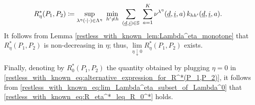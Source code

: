 \begin{equation}
	R_\eta^*(P_1,P_2)\coloneqq \sup\limits_{\lambda^\eta(\cdot\mid\cdot)\in \Lambda^\eta}~ \min\limits_{h'\neq h} ~\sum\limits_{(\underline{d},\underline{i})\in\mathbb{S}}~\sum\limits_{a=1}^{K}  \nu^{\lambda^\eta}(\underline{d},\underline{i},a) \,\textcolor{black}{k_{hh'}(\underline{d}, \underline{i}, a)}.\label{restless_with_known_eq:alternative_expression_for_R^*(P_1,P_2)}
\end{equation}
It follows from Lemma \ref{restless_with_known_lem:Lambda^eta_monotone} that $R_\eta^*(P_1,P_2)$ is non-decreasing in $\eta$; thus, $\lim\limits_{\eta\downarrow 0}R_\eta^*(P_1,P_2)$ exists.

Finally, denoting by $R_0^*(P_1,P_2)$ the quantity obtained by plugging $\eta=0$ in \eqref{restless_with_known_eq:alternative_expression_for_R^*(P_1,P_2)}, it follows from \eqref{restless_with_known_eq:lim_Lambda^eta_subset_of_Lambda^0} that \eqref{restless_with_known_eq:R_eta^*_leq_R_0^*} holds. 

%

